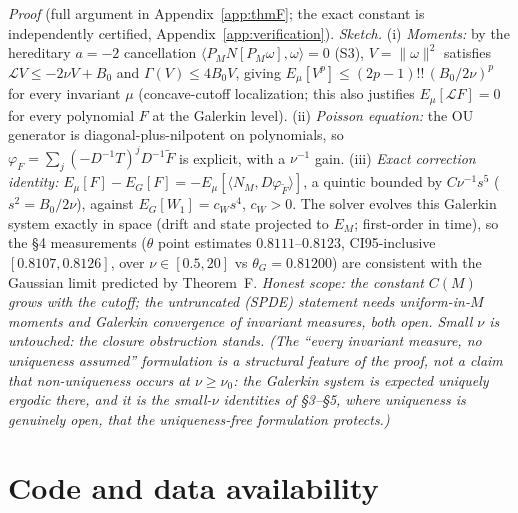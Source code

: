 \documentclass[11pt]{article}
\theoremstyle{remark}
\theoremstyle{plain}
\begin{document}
\emph{Proof} (full argument in Appendix~\ref{app:thmF}; the exact constant is
independently certified, Appendix~\ref{app:verification}). \emph{Sketch.} (i) \emph{Moments:} by the
hereditary $a=-2$ cancellation $\langle P_MN[P_M\omega],\omega\rangle = 0$ (S3),
$V = \|\omega\|^2$ satisfies $\mathcal{L}V \le -2\nu V + B_0$ and
$\Gamma(V) \le 4B_0V$, giving $E_\mu[V^p] \le (2p-1)!!\,(B_0/2\nu)^p$ for every
invariant $\mu$ (concave-cutoff localization; this also justifies
$E_\mu[\mathcal{L}F]=0$ for every polynomial $F$ at the Galerkin level).
(ii) \emph{Poisson equation:} the OU generator is diagonal-plus-nilpotent on
polynomials, so $\varphi_F = \sum_j(-D^{-1}T)^jD^{-1}\tilde F$ is explicit, with a
$\nu^{-1}$ gain. (iii) \emph{Exact correction identity:}
$E_\mu[F] - E_G[F] = -E_\mu[\langle N_M, D\varphi_{\tilde F}\rangle]$, a quintic
bounded by $C\nu^{-1}s^5$ ($s^2 = B_0/2\nu$), against $E_G[W_1] = c_Ws^4$,
$c_W>0$. The solver evolves this Galerkin system exactly in space (drift and state projected to $E_M$; first-order in time), so the \S4
measurements ($\theta$ point estimates $0.8111$--$0.8123$, CI95-inclusive
$[0.8107,0.8126]$, over $\nu \in [0.5,20]$ vs
$\theta_G = 0.81200$) are consistent with the Gaussian limit predicted by Theorem~F. \emph{Honest
scope: the constant $C(M)$ grows with the cutoff; the untruncated (SPDE)
statement needs uniform-in-$M$ moments and Galerkin convergence of invariant
measures, both open. Small $\nu$ is untouched: the closure obstruction stands. (The
``every invariant measure, no uniqueness assumed'' formulation is a structural feature of
the proof, not a claim that non-uniqueness occurs at $\nu\ge\nu_0$: the Galerkin
system is expected uniquely ergodic there, and it is the small-$\nu$ identities of
\S3--\S5, where uniqueness is genuinely open, that the uniqueness-free formulation
protects.)}

\section*{Code and data availability}
\end{document}
